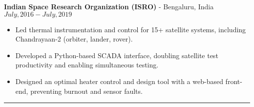 \textbf{Indian Space Research Organization (ISRO)} - Bengaluru, India \hfill $July, 2016 - July, 2019$

\begin{itemize}
        \item Led thermal instrumentation and control for 15+ satellite systems, including Chandrayaan-2 (orbiter, lander, rover).
        \item Developed a Python-based SCADA interface, doubling satellite test productivity and enabling simultaneous testing.
	\item Designed an optimal heater control and design tool with a web-based front-end, preventing burnout and sensor faults.
\end{itemize}
\noindent\rule{\textwidth}{0.4pt}
